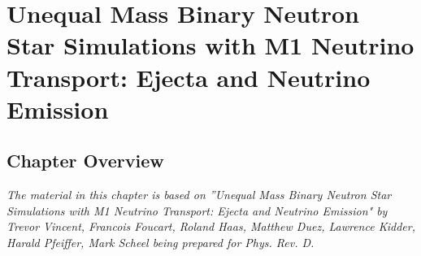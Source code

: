 \chapter{Unequal Mass Binary Neutron Star Simulations with M1 Neutrino Transport: Ejecta and Neutrino Emission}


\section{Chapter Overview}

\textit{The material in this chapter is based on ”Unequal Mass Binary Neutron Star Simulations with M1 Neutrino Transport: Ejecta and Neutrino Emission" by Trevor Vincent, Francois Foucart, Roland Haas, Matthew Duez, Lawrence Kidder, Harald Pfeiffer, Mark Scheel being prepared for Phys. Rev. D.}
